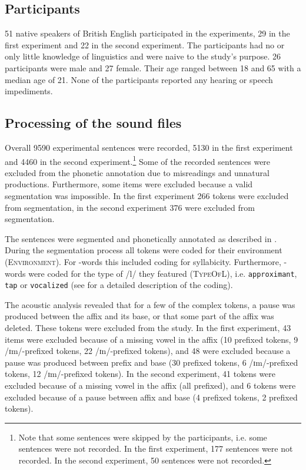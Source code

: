	
	\subsection{Participants}
	
51 native speakers of British English participated in the experiments, 29 in the first experiment and 22 in the second experiment. The participants had no or only little knowledge of linguistics and were naive to the study's purpose. 26 participants were male and 27 female. Their age ranged between 18 and 65 with a median age of 21. None of the participants reported any hearing or speech impediments.
	


\subsection{Processing of the sound files}

Overall 9590 experimental sentences were recorded, 5130 in the first experiment and 4460 in the second experiment.\footnote{Note that some sentences were skipped by the participants, i.e. some sentences were not recorded. In the first experiment, 177 sentences were not recorded. In the second experiment, 50 sentences were not recorded. } 
Some of the recorded sentences were excluded from the phonetic annotation due to misreadings and unnatural productions. Furthermore, some items  were excluded because a valid segmentation was impossible. In the first experiment 266 tokens were excluded from segmentation, in the second experiment 376 were excluded from segmentation.



The sentences were segmented and phonetically annotated as described in . 
During the segmentation process all tokens were coded for their environment (\textsc{Environment}). For -words this included coding for syllabicity. Furthermore, -words were coded for the type of /l/ they featured (\textsc{TypeOfL}), i.e. \texttt{approximant}, \texttt{tap} or \texttt{vocalized} (see  for a detailed description of the coding).


 The acoustic analysis revealed that for a few of the complex tokens, a pause was produced between the affix and its base, or that some part of the affix was deleted. These tokens were excluded from the study. 
 In the first experiment, 43 items were excluded because of a missing vowel in the affix  (10  prefixed tokens,  9 /ɪm/-prefixed tokens, 22 /ɪn/-prefixed tokens), and 48 were excluded because a pause was produced between prefix and base (30  prefixed tokens,  6 /ɪm/-prefixed tokens, 12 /ɪm/-prefixed tokens). 
 In the second experiment, 41 tokens were excluded because of a missing vowel in the affix (all prefixed), and 6 tokens were excluded because of a pause between affix and base (4 prefixed tokens, 2 prefixed tokens). %


